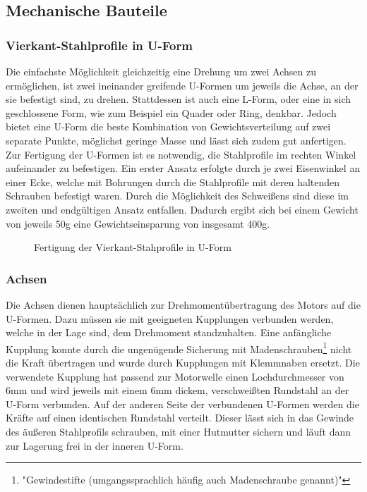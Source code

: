 \documentclass[a4paper, 12pt, bibliography=totocnumbered, listof=numbered]{scrartcl}
\begin{document}
	\subsection{Mechanische Bauteile}
	\subsubsection{Vierkant-Stahlprofile in U-Form}
	Die einfachste Möglichkeit gleichzeitig eine Drehung um zwei Achsen zu ermöglichen, ist zwei ineinander greifende U-Formen um jeweils die Achse, an der sie befestigt sind, zu drehen. Stattdessen ist auch eine L-Form, oder eine in sich geschlossene Form, wie zum Beispiel ein Quader oder Ring, denkbar. Jedoch bietet eine U-Form die beste Kombination von Gewichtsverteilung auf zwei separate Punkte, möglichst geringe Masse und lässt sich zudem gut anfertigen.
	Zur Fertigung der U-Formen ist es notwendig, die Stahlprofile im rechten Winkel aufeinander zu befestigen. Ein erster Ansatz erfolgte durch je zwei Eisenwinkel an einer Ecke, welche mit Bohrungen durch die Stahlprofile mit deren haltenden Schrauben befestigt waren. Durch die Möglichkeit des Schweißens sind diese im zweiten und endgültigen Ansatz entfallen. Dadurch ergibt sich bei einem Gewicht von jeweils 50g eine Gewichtseinsparung von insgesamt 400g.

	\begin{figure}[htb]
		\centering
		\hfill
		\caption{Fertigung der Vierkant-Stahprofile in U-Form}
	\end{figure}

	\subsubsection{Achsen}
	Die Achsen dienen hauptsächlich zur Drehmomentübertragung des Motors auf die U-Formen. Dazu müssen sie mit geeigneten Kupplungen verbunden werden, welche in der Lage sind, dem Drehmoment standzuhalten. Eine anfängliche Kupplung konnte durch die ungenügende Sicherung mit Madenschrauben\footnote{"Gewindestifte (umgangssprachlich häufig auch Madenschraube genannt)"\cite{wikipedia-madenschraube}} nicht die Kraft übertragen und wurde durch Kupplungen mit Klemmnaben\cite{kupplung} ersetzt. Die verwendete Kupplung hat passend zur Motorwelle einen Lochdurchmesser von 6mm und wird jeweils mit einem 6mm dickem, verschweißten Rundstahl an der U-Form verbunden. Auf der anderen Seite der verbundenen U-Formen werden die Kräfte auf einen identischen Rundstahl verteilt. Dieser lässt sich in das Gewinde des äußeren Stahlprofils schrauben, mit einer Hutmutter sichern und läuft dann zur Lagerung frei in der inneren U-Form.
\end{document}

